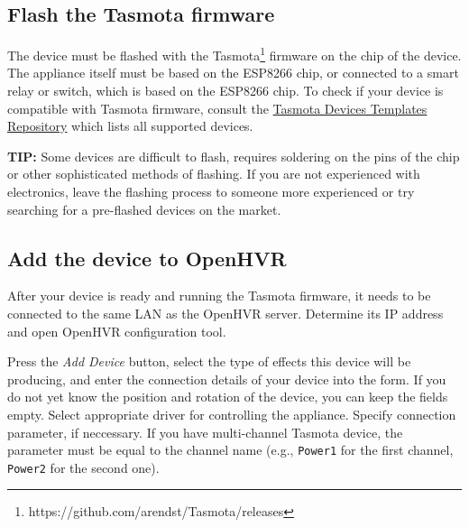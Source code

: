 \subsection*{Flash the Tasmota firmware}

The device must be flashed with the 
Tasmota\footnote{https://github.com/arendst/Tasmota/releases}
firmware on the chip of the device.
The appliance itself must be based on the ESP8266 chip, or connected to a 
smart relay or switch, which is based on the ESP8266 chip. To check if your
device is compatible with Tasmota firmware, consult the 
\hyperlink{https://templates.blakadder.com}{Tasmota Devices Templates Repository}
which lists all supported devices.

\textbf{TIP:} Some devices are difficult to flash, requires soldering on the
pins of the chip or other sophisticated methods of flashing. If you are not
experienced with electronics, leave the flashing process to someone
more experienced or try searching for a pre-flashed devices on the market.

\subsection*{Add the device to OpenHVR}

After your device is ready and running the Tasmota firmware, it needs to be
connected to the same LAN as the OpenHVR server. Determine its IP address and
open OpenHVR configuration tool.

Press the \textit{Add Device} button, select the type of effects this device
will be producing, and enter the connection details of your device into
the form. If you do not yet know the position and rotation of the device, you
can keep the fields empty. Select appropriate driver for controlling the
appliance. Specify connection parameter, if neccessary. If you have multi-channel
Tasmota device, the parameter must be equal to the channel name 
(e.g., \verb|Power1| for the first channel, \verb|Power2| for the second one).